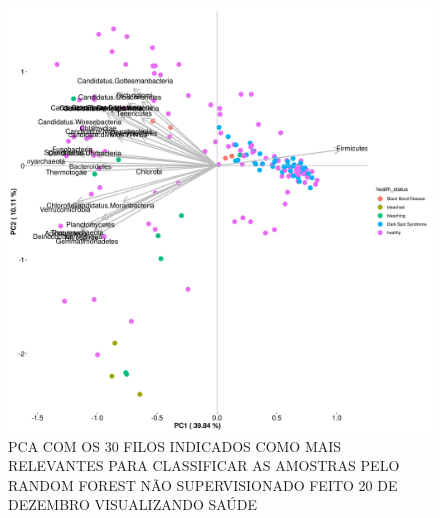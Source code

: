 \documentclass[12pt, a4paper]{report}
\begin{document}
\begin{figure}[H]
	\centering
	\includegraphics[scale=0.4]{figures/PCA_rf_nao_super_30_157_corais_health_2018_12_20.png}
	\caption{PCA COM OS 30 FILOS INDICADOS COMO MAIS RELEVANTES PARA CLASSIFICAR AS AMOSTRAS PELO RANDOM FOREST NÃO SUPERVISIONADO FEITO 20 DE DEZEMBRO VISUALIZANDO SAÚDE}
	\label{fig: PCA COM OS 30 FILOS INDICADOS COMO MAIS RELEVANTES PARA CLASSIFICAR AS AMOSTRAS PELO RANDOM FOREST NÃO SUPERVISIONADO FEITO 20 DE DEZEMBRO VISUALIZANDO SAÚDE}
\end{figure}
\end{document}
